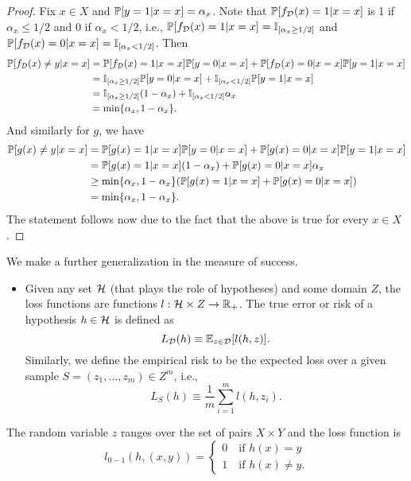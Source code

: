 \documentclass[11pt,a4paper]{article}
\begin{document}
\begin{proof}
Fix $x\in X$ and $\mathbb{P}[y = 1|x = x] = \alpha_x$. Note that $\mathbb{P}[f_{\mathcal{D}}(x) = 1|x = x]$ is 1 if $\alpha_x\le 1/2$ and 0 if $\alpha_x< 1/2$, i.e., $\mathbb{P}[f_{\mathcal{D}}(x) = 1|x = x] = \mathbb{I}_{[\alpha_x\ge 1/2]}$ and $\mathbb{P}[f_{\mathcal{D}}(x) = 0|x = x] = \mathbb{I}_{[\alpha_x<1/2]}$. Then
\begin{align*}
\mathbb{P}[f_{\mathcal{D}}(x)\neq y|x=x] &= \mathbb{P}[f_{\mathcal{D}}(x) = 1|x=x] \mathbb{P}[y=0|x=x]+ \mathbb{P}[f_{\mathcal{D}}(x) = 0|x=x] \mathbb{P}[y=1|x=x] \\
&= \mathbb{I}_{[\alpha_x\ge 1/2]} \mathbb{P}[y=0|x=x]+ \mathbb{I}_{[\alpha_x< 1/2]} \mathbb{P}[y=1|x=x] \\
&= \mathbb{I}_{[\alpha_x\ge 1/2]} (1-\alpha_x)+ \mathbb{I}_{[\alpha_x< 1/2]} \alpha_x \\
&= \text{min}\{\alpha_x , 1-\alpha_x\}.
\end{align*}
And similarly for $g$, we have
\begin{align*}
\mathbb{P}[g(x)\neq y|x=x] &= \mathbb{P}[g(x) = 1|x=x] \mathbb{P}[y=0|x=x]+ \mathbb{P}[g(x) = 0|x=x] \mathbb{P}[y=1|x=x] \\
&= \mathbb{P}[g(x) = 1|x=x] (1-\alpha_x)+ \mathbb{P}[g(x) = 0|x=x] \alpha_x \\
&\ge \text{min}\{\alpha_x , 1-\alpha_x\}(\mathbb{P}[g(x) = 1|x=x] + \mathbb{P}[g(x) = 0|x=x])\\
&= \text{min}\{\alpha_x , 1-\alpha_x\}.
\end{align*}
The statement follows now due to the fact that the above is true for
every $x\in X$.
\end{proof}

We make a further generalization in the measure of success.
\begin{itemize}
\item {} Given any set $\mathcal{H}$ (that plays the role of hypotheses) and some domain $Z$, the loss functions are functions $l:\mathcal{H}\times Z\rightarrow \mathbb{R}_+$. The true error or risk of a hypothesis $h\in \mathcal{H}$ is defined as
\begin{equation*}
L_{\mathcal{D}}(h) \equiv \mathbb{E}_{z\in\mathcal{D}}[l(h,z)].
\end{equation*}
Similarly, we define the empirical risk to be the expected loss over a given sample $S = (z_1,\ldots,z_m)\in Z^m$, i.e.,
\begin{equation*}
L_S(h) \equiv \dfrac{1}{m}\sum_{i=1}^m l(h,z_i).
\end{equation*}
\end{itemize}

\begin{example}
The random variable $z$ ranges over the set of pairs $X\times Y$ and the loss function is 
\begin{equation*}
    l_{0-1}(h,(x,y)) = \begin{cases}
    0\quad \text{if }h(x) = y\\
    1\quad \text{if }h(x)\neq y.
    \end{cases}
\end{equation*}
\end{example}
\end{document}

